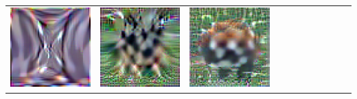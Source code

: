 \documentclass[main.tex]{subfiles}
\begin{document}
{\begin{center}
\begin{tabular}{ccccccccccc}
    \includegraphics[align=c,width=\coverwidth\linewidth]{figures/cover/tiny/hourglass_0.pdf} &
    \includegraphics[align=c,width=\coverwidth\linewidth]{figures/cover/tiny/z_german_shepherd_0.pdf} &
    \includegraphics[align=c,width=\coverwidth\linewidth]{figures/cover/tiny/lesser_panda_0.pdf} &

\end{tabular}
\end{center}}
\end{document}

